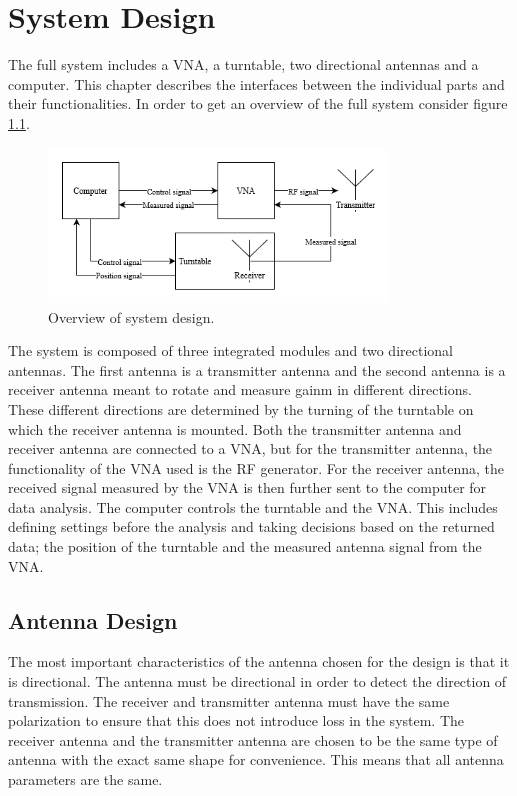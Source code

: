 \chapter{System Design} \label{ch:design}
The full system includes a VNA, a turntable, two directional antennas and a computer. This chapter describes the interfaces between the individual parts and their functionalities. In order to get an overview of the full system consider figure \ref{fig:system_design}.
\begin{figure}[H]
    \centering
    \includegraphics[width=0.8\textwidth]{figures/system_design.png}
    \caption{Overview of system design.} \label{fig:system_design}
\end{figure}
The system is composed of three integrated modules and two directional antennas. The first antenna is a transmitter antenna and the second antenna is a receiver antenna meant to rotate and measure gainm in different directions. These different directions are determined by the turning of the turntable on which the receiver antenna is mounted. Both the transmitter antenna and receiver antenna are connected to a VNA, but for the transmitter antenna, the functionality of the VNA used is the RF generator. For the receiver antenna, the received signal measured by the VNA is then further sent to the computer for data analysis. The computer controls the turntable and the VNA. This includes defining settings before the analysis and taking decisions based on the returned data; the position of the turntable and the measured antenna signal from the VNA. 


\section{Antenna Design} \label{s:ant_design}
The most important characteristics of the antenna chosen for the design is that it is directional. The antenna must be directional in order to detect the direction of transmission. The receiver and transmitter antenna must have the same polarization to ensure that this does not introduce loss in the system. The receiver antenna and the transmitter antenna are chosen to be the same type of antenna with the exact same shape for convenience. This means that all antenna parameters are the same. 

